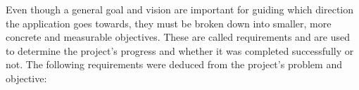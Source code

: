 
Even though a general goal and vision are important for guiding which direction the application goes towards, they must be broken down into smaller, more concrete and measurable objectives. These are called requirements and are used to determine the project’s progress and whether it was completed successfully or not. The following requirements were deduced from the project’s problem and objective:

